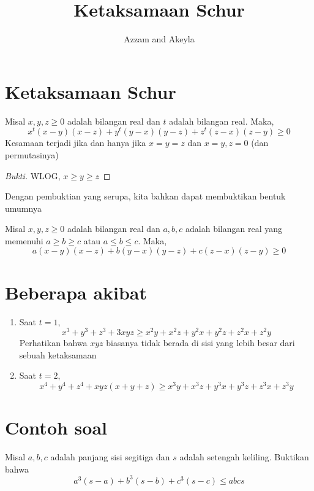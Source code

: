 \documentclass[11pt]{scrartcl}
\title{Ketaksamaan Schur}
\author{Azzam and Akeyla}
\begin{document}
\maketitle

\renewcommand*\contentsname{Daftar Isi}
\tableofcontents

\newpage

\section{Ketaksamaan Schur}
\begin{theorem}
Misal $x, y, z \geq 0$ adalah bilangan real dan $t$ adalah bilangan real. Maka,
\[x^t(x - y)(x - z) + y^t(y - x)(y - z) + z^t(z - x)(z - y) \geq 0\]
Kesamaan terjadi jika dan hanya jika $x = y = z$ dan $x = y, z = 0$ (dan permutasinya)
\end{theorem}

\begin{proof}[Bukti]
WLOG, $x \geq y \geq z$
\end{proof}

Dengan pembuktian yang serupa, kita bahkan dapat membuktikan bentuk umumnya
\begin{theorem}
Misal $x, y, z \geq 0$ adalah bilangan real dan $a, b, c$ adalah bilangan real yang memenuhi $a \geq b \geq c$ atau $a \leq b \leq c$. Maka,
\[a(x - y)(x - z) + b(y - x)(y - z) + c(z - x)(z - y) \geq 0\]
\end{theorem}

\section{Beberapa akibat}
\begin{enumerate}
    \item Saat $t = 1$, \[x^3 + y^3 + z^3 + 3xyz \geq x^2y + x^2z + y^2x + y^2z + z^2x + z^2y\]
    Perhatikan bahwa $xyz$ biasanya tidak berada di sisi yang lebih besar dari sebuah ketaksamaan
    \item Saat $t = 2$, \[x^4 + y^4 + z^4 + xyz(x + y + z) \geq x^3y + x^3z + y^3x + y^3z + z^3x + z^3y\]
\end{enumerate}

\section{Contoh soal}
\begin{problem}
Misal $a, b, c$ adalah panjang sisi segitiga dan $s$ adalah setengah keliling. Buktikan bahwa \[a^3(s - a) + b^3(s - b) + c^3(s - c) \leq abcs\]
\end{problem}
\end{document}
